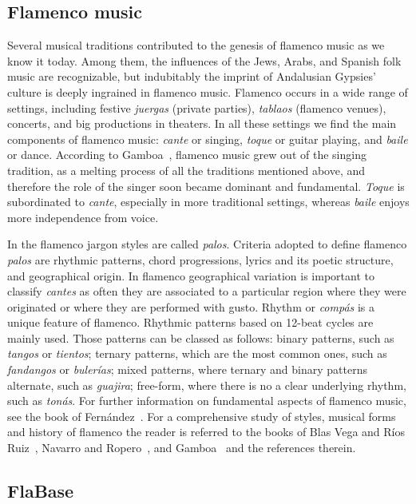 \subsection{Flamenco music}\label{sec:flamenco}

Several musical traditions contributed to the genesis of flamenco music as we know it today. Among them, the influences of the Jews, Arabs, and Spanish folk music are recognizable, but indubitably  the imprint of Andalusian Gypsies' culture is deeply ingrained in flamenco music. 
Flamenco occurs in a wide range of settings, including festive \textit{juergas} (private parties), \textit{tablaos} (flamenco venues), concerts, and big productions in theaters. In all these settings we find the main components of flamenco music: \textit{cante} or singing, \textit{toque} or guitar playing, and \textit{baile} or dance. According to Gamboa~\cite{gamboa-05}, flamenco music grew out of the singing tradition, as a melting process of all the traditions mentioned above, and therefore the role of the singer soon became dominant and fundamental. \textit{Toque}  is subordinated to \textit{cante}, especially in more traditional settings, whereas \textit{baile} enjoys more independence from voice. 

In the flamenco jargon styles are called \textit{palos}. Criteria adopted to define flamenco \textit{palos} are rhythmic patterns, chord progressions, lyrics and its poetic structure, and geographical origin. In flamenco geographical variation is important to classify \textit{cantes} as often they are associated to a particular region where they were originated or where they are performed with gusto. 
Rhythm or \textit{comp\'as} is a unique feature of flamenco.
Rhythmic patterns based on 12-beat cycles are mainly used. Those patterns can be classed as follows: binary patterns, such as \textit{tangos} or \textit{tientos}; ternary patterns, which are the most common ones, such as \textit{fandangos} or \textit{buler\'ias}; mixed patterns, where ternary and binary patterns alternate, such as \textit{guajira}; free-form, where there is no a clear underlying rhythm, such as \textit{ton\'as}.
For further information on fundamental aspects of flamenco music, see the book of Fern\'andez~\cite{fer-04}. For a comprehensive study of styles, musical forms and history of flamenco the reader is referred to the books of Blas Vega and R\'ios Ruiz~\cite{bvrr-88}, Navarro and Ropero~\cite{nr-95}, and Gamboa~\cite{gamboa-05} and the references therein.


\subsection{FlaBase}\label{sec:flabase}

